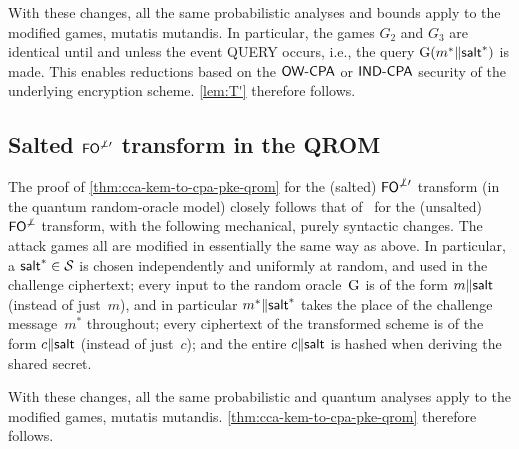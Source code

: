 \documentclass{iacrcc}
\begin{document}
With these changes, all the same probabilistic analyses and bounds apply to the modified games, mutatis mutandis.
In particular, the games $G_{2}$ and $G_{3}$ are identical until and unless the event QUERY occurs, i.e., the query $\textrm{\upshape\mdseries G}(m^{*} \| {\mathsf{salt}}^{*})$ is made.
This enables reductions based on the $\textsf{\upshape\mdseries OW-CPA}$ or $\textsf{\upshape\mdseries IND-CPA}$ security of the underlying encryption scheme.
\autoref{lem:T'} therefore follows.

\subsection{Salted $\textsf{\upshape\mdseries FO}^{\not\perp\prime}$ transform in the QROM}\label{sec:salted-FO}

The proof of \autoref{thm:cca-kem-to-cpa-pke-qrom} for the (salted) $\textsf{\upshape\mdseries FO}^{\not\perp\prime}$ transform (in the quantum random-oracle model) closely follows that of~\cite[Theorem~1]{C:JZCWM18} for the (unsalted) $\textsf{\upshape\mdseries FO}^{\not\perp}$ transform, with the following mechanical, purely syntactic changes.
The attack games all are modified in essentially the same way as above.
In particular, a ${\mathsf{salt}}^{*} \in \mathcal{S}$ is chosen independently and uniformly at random, and used in the challenge ciphertext; every input to the random oracle~$\textrm{\upshape\mdseries G}$ is of the form $m \| {\mathsf{salt}}$ (instead of just~$m$), and in particular $m^{*} \| {\mathsf{salt}}^{*}$ takes the place of the challenge message~$m^{*}$ throughout; every ciphertext of the transformed scheme is of the form $c \| {\mathsf{salt}}$ (instead of just~$c$); and the entire $c \| {\mathsf{salt}}$ is hashed when deriving the shared secret.

With these changes, all the same probabilistic and quantum analyses apply to the modified games, mutatis mutandis.
\autoref{thm:cca-kem-to-cpa-pke-qrom} therefore follows.
\end{document}
